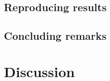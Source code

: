 \documentclass[DIV=calc,BCOR=0mm,pagesize]{scrartcl}
\begin{document}
\subsection{Reproducing  results}
\label{ssec:resrep}
\lipsum[0]


\subsection{Concluding remarks}
\label{ssec:rescon}
\lipsum[0]


\section{Discussion}
\label{sec:dis}

\citep{wilensky_netlogo_1999}
\newpage%
\end{document}
